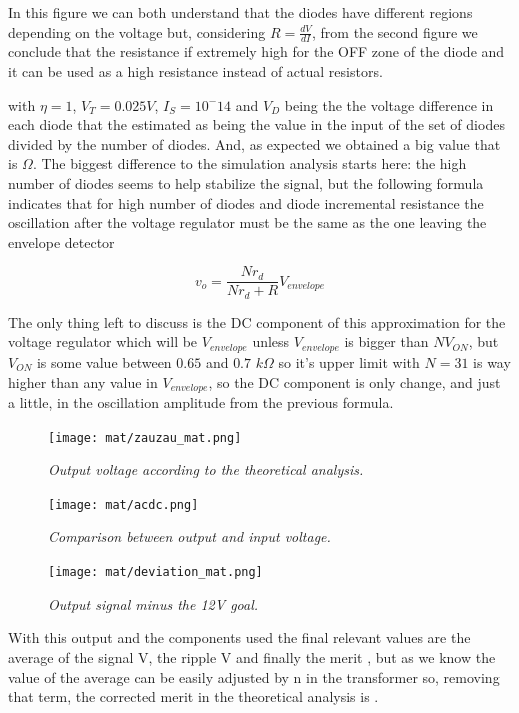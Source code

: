 In this figure we can both understand that the diodes have different regions depending on the voltage but, considering $R=\frac{dV}{dI}$, from the second figure we conclude that the resistance if extremely high for the OFF zone of the diode and it can be used as a high resistance instead of actual resistors.

with $\eta=1$, $V_T = 0.025V$, $I_S=10^-{14}$ and $V_D$ being the the voltage difference in each diode that the estimated as being the value in the input of the set of diodes divided by the number of diodes. And, as expected we obtained a big value that is $\Omega$. The biggest difference to the simulation analysis starts here: the high number of diodes seems to help stabilize the signal, but the following formula indicates that for high number of diodes and diode incremental resistance the oscillation after the voltage regulator must be the same as the one leaving the envelope detector

\begin{equation}
    v_o = \frac{N r_d}{N r_d + R}V_{envelope}
    \label{eq:v_o_mat}
\end{equation}

The only thing left to discuss is the DC component of this approximation for the voltage regulator which will be $V_{envelope}$ unless $V_{envelope}$ is bigger than $N V_{ON}$, but $V_{ON}$ is some value between $0.65$ and $0.7$ $k\Omega$ so it's upper limit with $N=31$ is way higher than any value in $V_{envelope}$, so the DC component is only change, and just a little, in the oscillation amplitude from the previous formula.


\begin{figure}[H]
    \centering
    \texttt{[image: mat/zauzau\_mat.png]}
        \caption{\textit{Output voltage according to the theoretical analysis.}}
    \label{fig:plot3}
\end{figure}

\begin{figure}[H]
    \centering
    \texttt{[image: mat/acdc.png]}
        \caption{\textit{Comparison between output and input voltage.}}
    \label{fig:plot4}
\end{figure}

\begin{figure}[H]
    \centering
    \texttt{[image: mat/deviation\_mat.png]}
        \caption{\textit{Output signal minus the 12V goal.}}
    \label{fig:plot5}
\end{figure}

With this output and the components used the final relevant values are the average of the signal V, the ripple V and finally the merit , but as we know the value of the average can be easily adjusted by n in the transformer so, removing that term, the corrected merit in the theoretical analysis is .